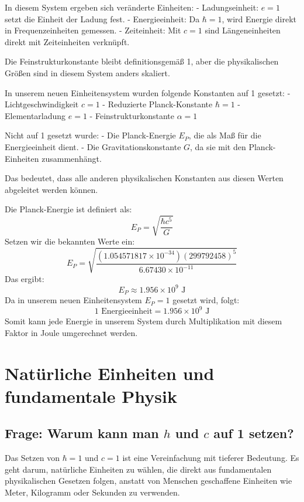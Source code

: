 \documentclass{article}
\begin{document}
	In diesem System ergeben sich veränderte Einheiten:
	- Ladungseinheit: \( e = 1 \) setzt die Einheit der Ladung fest.
	- Energieeinheit: Da \( \hbar = 1 \), wird Energie direkt in Frequenzeinheiten gemessen.
	- Zeiteinheit: Mit \( c = 1 \) sind Längeneinheiten direkt mit Zeiteinheiten verknüpft.
	
	Die Feinstrukturkonstante bleibt definitionsgemäß 1, aber die physikalischen Größen sind in diesem System anders skaliert.
	
	In unserem neuen Einheitensystem wurden folgende Konstanten auf 1 gesetzt:
	- Lichtgeschwindigkeit \( c = 1 \)
	- Reduzierte Planck-Konstante \( \hbar = 1 \)
	- Elementarladung \( e = 1 \)
	- Feinstrukturkonstante \( \alpha = 1 \)
	
	Nicht auf 1 gesetzt wurde:
	- Die Planck-Energie \( E_P \), die als Maß für die Energieeinheit dient.
	- Die Gravitationskonstante \( G \), da sie mit den Planck-Einheiten zusammenhängt.
	
	Das bedeutet, dass alle anderen physikalischen Konstanten aus diesen Werten abgeleitet werden können.
	
	Die Planck-Energie ist definiert als:
	\[
	E_P = \sqrt{\frac{\hbar c^5}{G}}
	\]
	Setzen wir die bekannten Werte ein:
	\[
	E_P = \sqrt{\frac{(1.054571817 \times 10^{-34}) (299792458)^5}{6.67430 \times 10^{-11}}}
	\]
	Das ergibt:
	\[
	E_P \approx 1.956 \times 10^9 \text{ J}
	\]
	Da in unserem neuen Einheitensystem \( E_P = 1 \) gesetzt wird, folgt:
	\[
	1 \text{ Energieeinheit} = 1.956 \times 10^9 \text{ J}
	\]
	Somit kann jede Energie in unserem System durch Multiplikation mit diesem Faktor in Joule umgerechnet werden.
	
	\section{Natürliche Einheiten und fundamentale Physik}
	
	\subsection{Frage: Warum kann man $h$ und $c$ auf 1 setzen?}
	
	Das Setzen von $\hbar = 1$ und $c = 1$ ist eine Vereinfachung mit tieferer Bedeutung. Es geht darum, natürliche Einheiten zu wählen, die direkt aus fundamentalen physikalischen Gesetzen folgen, anstatt von Menschen geschaffene Einheiten wie Meter, Kilogramm oder Sekunden zu verwenden.
	
\end{document}
